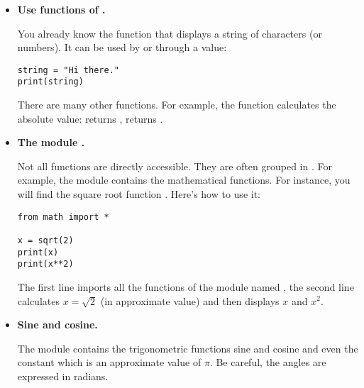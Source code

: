 \documentclass[11pt,class=report,crop=false]{standalone}
\begin{document}
\begin{cours}
\sauteligne
\begin{itemize}
  \item \textbf{Use functions of \Python.}
  
  You already know the  function that displays a string of characters (or numbers). It can be used by  or through a value: 
\begin{center}
\begin{minipage}{0.5\textwidth}
\begin{lstlisting}  
string = "Hi there."
print(string)
\end{lstlisting}
\end{minipage}
\end{center} 	 

  There are many other functions. For example, the function  calculates the absolute value:  returns ,  returns .

  \item \textbf{The module .}

	Not all functions are directly accessible. They are often grouped in . For example, the module  contains the mathematical functions. For instance, you will find the square root function . Here's how to use it: 
\begin{center}
\begin{minipage}{0.5\textwidth}
\begin{lstlisting} 
from math import *

x = sqrt(2)
print(x)
print(x**2)
\end{lstlisting}
\end{minipage}

\end{center} 	

The first line imports all the functions of the module named , the second line calculates $x = \sqrt{2}$ (in approximate value) and then displays $x$ and $x^2$.	

  \item \textbf{Sine and cosine.} 
  
  The module  contains the trigonometric functions sine  and cosine  and even the constant \index{$\pi$} which is an approximate value of $\pi$. Be careful, the angles are expressed in radians.


\end{itemize}
\end{cours}
\end{document}
